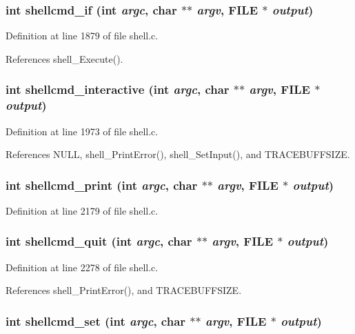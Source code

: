 \subsubsection{\setlength{\rightskip}{0pt plus 5cm}int shellcmd\_\-if (int {\em argc}, char $\ast$$\ast$ {\em argv}, FILE $\ast$ {\em output})}\label{shell_8h_a33}




Definition at line 1879 of file shell.c.

References shell\_\-Execute().
\subsubsection{\setlength{\rightskip}{0pt plus 5cm}int shellcmd\_\-interactive (int {\em argc}, char $\ast$$\ast$ {\em argv}, FILE $\ast$ {\em output})}\label{shell_8h_a34}




Definition at line 1973 of file shell.c.

References NULL, shell\_\-Print\-Error(), shell\_\-Set\-Input(), and TRACEBUFFSIZE.
\subsubsection{\setlength{\rightskip}{0pt plus 5cm}int shellcmd\_\-print (int {\em argc}, char $\ast$$\ast$ {\em argv}, FILE $\ast$ {\em output})}\label{shell_8h_a37}




Definition at line 2179 of file shell.c.
\subsubsection{\setlength{\rightskip}{0pt plus 5cm}int shellcmd\_\-quit (int {\em argc}, char $\ast$$\ast$ {\em argv}, FILE $\ast$ {\em output})}\label{shell_8h_a40}




Definition at line 2278 of file shell.c.

References shell\_\-Print\-Error(), and TRACEBUFFSIZE.
\subsubsection{\setlength{\rightskip}{0pt plus 5cm}int shellcmd\_\-set (int {\em argc}, char $\ast$$\ast$ {\em argv}, FILE $\ast$ {\em output})}\label{shell_8h_a35}




